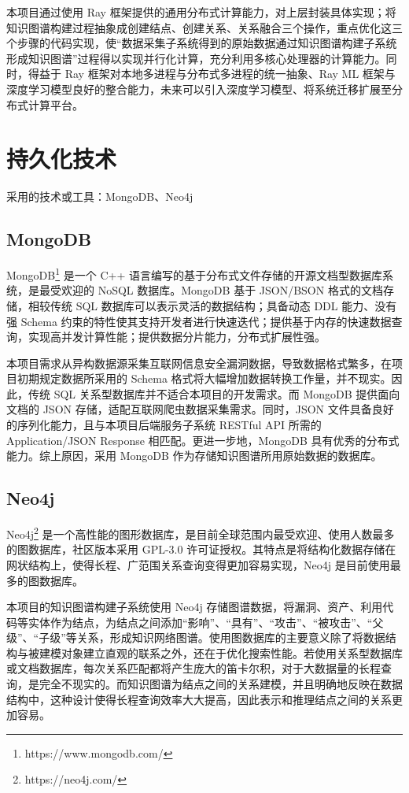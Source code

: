 \documentclass[a4paper,AutoFakeBold,oneside,12pt]{book}
\begin{document}
本项目通过使用 Ray 框架提供的通用分布式计算能力，对上层封装具体实现；将知识图谱构建过程抽象成创建结点、创建关系、关系融合三个操作，重点优化这三个步骤的代码实现，使``数据采集子系统得到的原始数据通过知识图谱构建子系统形成知识图谱''过程得以实现并行化计算，充分利用多核心处理器的计算能力。同时，得益于 Ray 框架对本地多进程与分布式多进程的统一抽象、Ray ML 框架与深度学习模型良好的整合能力，未来可以引入深度学习模型、将系统迁移扩展至分布式计算平台。

\section{持久化技术}

采用的技术或工具：MongoDB、Neo4j

\subsection{MongoDB}

MongoDB\footnote{https://www.mongodb.com/} 是一个 C++ 语言编写的基于分布式文件存储的开源文档型数据库系统，是最受欢迎的 NoSQL 数据库。MongoDB 基于 JSON/BSON 格式的文档存储，相较传统 SQL 数据库可以表示灵活的数据结构；具备动态 DDL 能力、没有强 Schema 约束的特性使其支持开发者进行快速迭代；提供基于内存的快速数据查询，实现高并发计算性能；提供数据分片能力，分布式扩展性强。

本项目需求从异构数据源采集互联网信息安全漏洞数据，导致数据格式繁多，在项目初期规定数据所采用的 Schema 格式将大幅增加数据转换工作量，并不现实。因此，传统 SQL 关系型数据库并不适合本项目的开发需求。而 MongoDB 提供面向文档的 JSON 存储，适配互联网爬虫数据采集需求。同时，JSON 文件具备良好的序列化能力，且与本项目后端服务子系统 RESTful API 所需的 Application/JSON Response 相匹配。更进一步地，MongoDB 具有优秀的分布式能力。综上原因，采用 MongoDB 作为存储知识图谱所用原始数据的数据库。

\subsection{Neo4j}

Neo4j\footnote{https://neo4j.com/} 是一个高性能的图形数据库，是目前全球范围内最受欢迎、使用人数最多的图数据库，社区版本采用 GPL-3.0 许可证授权。其特点是将结构化数据存储在网状结构上，使得长程、广范围关系查询变得更加容易实现，Neo4j 是目前使用最多的图数据库。

本项目的知识图谱构建子系统使用 Neo4j 存储图谱数据，将漏洞、资产、利用代码等实体作为结点，为结点之间添加``影响''、``具有''、``攻击''、``被攻击''、``父级''、``子级''等关系，形成知识网络图谱。使用图数据库的主要意义除了将数据结构与被建模对象建立直观的联系之外，还在于优化搜索性能。若使用关系型数据库或文档数据库，每次关系匹配都将产生庞大的笛卡尔积，对于大数据量的长程查询，是完全不现实的。而知识图谱为结点之间的关系建模，并且明确地反映在数据结构中，这种设计使得长程查询效率大大提高，因此表示和推理结点之间的关系更加容易。
\end{document}
